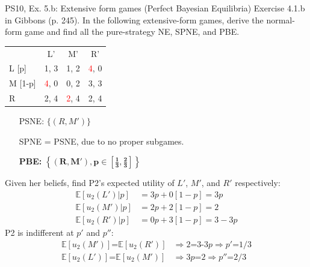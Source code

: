 \begin{frame}{PS10, Ex. 5.b: Extensive form games (Perfect Bayesian Equilibria)}
    Exercise 4.1.b in Gibbons (p. 245). In the following extensive-form games, derive the normal-form game and find all the pure-strategy NE, SPNE, and PBE.
    \vspace{-9pt}
    \begin{multicols}{2}
      \begin{table}
        \begin{tabular}{l|c|c|c|}
          \multicolumn{1}{c}{} & \multicolumn{1}{c}{L'} & \multicolumn{1}{c}{M'} & \multicolumn{1}{c}{R'} \\\cline{2-4}
          L [p]   & 1, \color{blue}3 & 1, 2 & \textcolor{red}{4}, 0 \\\cline{2-4}
          M [1-p] & \textcolor{red}{4}, 0 & 0, 2 & 3, \color{blue}3 \\\cline{2-4}
          R       & 2, \color{blue}4 & \textcolor{red}{2}, \color{blue}4 & 2, \color{blue}4 \\\cline{2-4}
        \end{tabular}
      \end{table} \vspace{-8pt}
      \begin{itemize}
        \item[PSNE:] $\{(R,M')\}$
        \item[SPNE =] PSNE, due to no proper subgames.
        \item[\textbf{PBE:}] $\bm{\left\{(R,M'),p\in\left[\frac{1}{3},\frac{2}{3}\right]\right\}}$
      \end{itemize} \vspace{-6pt}
      Given her beliefs, find P2's expected utility of $L'$, $M'$, and $R'$ respectively: \vspace{-6pt}
      \begin{align*}
        \mathbb{E}[u_2(L')|p]&=3p+0[1-p]=3p\\
        \mathbb{E}[u_2(M')|p]&=2p+2[1-p]=2\\
        \mathbb{E}[u_2(R')|p]&=0p+3[1-p]=3-3p
      \end{align*}
      P2 is indifferent at $p'$ and $p''$: \vspace{-6pt}
      \begin{align*}
        \mathbb{E}[u_2(M')]\text{=}\mathbb{E}[u_2(R')]&\Rightarrow 2\text{=3-3}p\Rightarrow p'\text{=}1/3\\
        \mathbb{E}[u_2(L')]\text{=}\mathbb{E}[u_2(M')]&\Rightarrow 3p\text{=}2\Rightarrow p''\text{=}2/3

\end{align*}
\end{multicols}
\end{frame}
